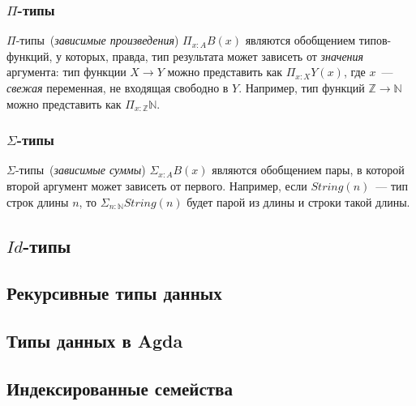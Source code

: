 \subsubsection{$\Pi$-типы}

$\Pi$-типы~(\emph{зависимые произведения}) $\Pi_{x:A} B(x)$ являются
обобщением типов-функций, у которых, правда, тип результата может
зависеть от \emph{значения} аргумента: тип функции $X \to Y$ можно
представить как $\Pi_{x:X} Y(x)$, где $x$~--- \emph{свежая}
переменная, не входящая свободно в $Y$. Например, тип функций
$\mathbb{Z} \to \mathbb{N}$ можно представить как $\Pi_{x:\mathbb{Z}}
\mathbb{N}$.

\subsubsection{$\Sigma$-типы}

$\Sigma$-типы~(\emph{зависимые суммы}) $\Sigma_{x:A} B(x)$ являются
обобщением пары, в которой второй аргумент может зависеть от первого.
Например, если $String(n)$~--- тип строк длины $n$, то
$\Sigma_{n:\mathbb{N}} String(n)$ будет парой из длины и строки такой
длины.

\subsection{$Id$-типы}


\subsection{Рекурсивные типы данных}


\subsection{Типы данных в Agda}


\subsection{Индексированные семейства}

